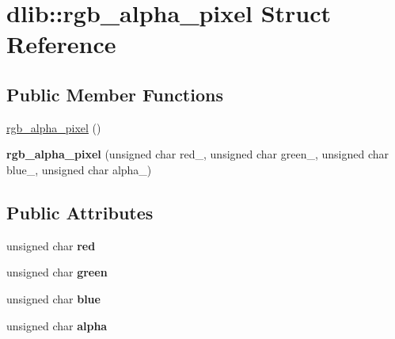 \hypertarget{structdlib_1_1rgb__alpha__pixel}{
\section{dlib::rgb\_\-alpha\_\-pixel Struct Reference}
\label{structdlib_1_1rgb__alpha__pixel}
}
\subsection*{Public Member Functions}
\begin{DoxyCompactItemize}
\item 
\hyperlink{structdlib_1_1rgb__alpha__pixel_a3214ab60e949914276ca302c0a67d519}{rgb\_\-alpha\_\-pixel} ()
\item 
\hypertarget{structdlib_1_1rgb__alpha__pixel_adf036a736ca99186cb739f142b620f01}{
{\bfseries rgb\_\-alpha\_\-pixel} (unsigned char red\_\-, unsigned char green\_\-, unsigned char blue\_\-, unsigned char alpha\_\-)}
\label{structdlib_1_1rgb__alpha__pixel_adf036a736ca99186cb739f142b620f01}

\end{DoxyCompactItemize}
\subsection*{Public Attributes}
\begin{DoxyCompactItemize}
\item 
\hypertarget{structdlib_1_1rgb__alpha__pixel_a76c34d0df32c02d5b194a2b0660d7d2c}{
unsigned char {\bfseries red}}
\label{structdlib_1_1rgb__alpha__pixel_a76c34d0df32c02d5b194a2b0660d7d2c}

\item 
\hypertarget{structdlib_1_1rgb__alpha__pixel_a5d6f19c74f9ee2acf8bf3de0d2e1d888}{
unsigned char {\bfseries green}}
\label{structdlib_1_1rgb__alpha__pixel_a5d6f19c74f9ee2acf8bf3de0d2e1d888}

\item 
\hypertarget{structdlib_1_1rgb__alpha__pixel_affb0ab249f503f3e721ea841578fd2e1}{
unsigned char {\bfseries blue}}
\label{structdlib_1_1rgb__alpha__pixel_affb0ab249f503f3e721ea841578fd2e1}

\item 
\hypertarget{structdlib_1_1rgb__alpha__pixel_a00c3d5272d83f7763e2abe0d6eb58fac}{
unsigned char {\bfseries alpha}}
\label{structdlib_1_1rgb__alpha__pixel_a00c3d5272d83f7763e2abe0d6eb58fac}

\end{DoxyCompactItemize}


